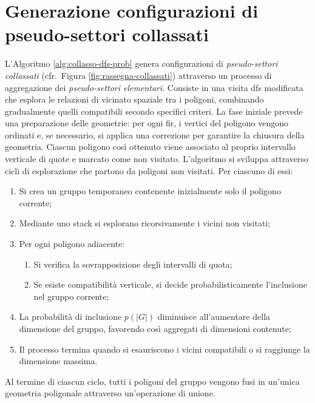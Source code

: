 \section{Generazione configurazioni di pseudo-settori collassati}
\label{subsec:algo-collassati}
L'Algoritmo \ref{alg:collasso-dfs-prob} genera configurazioni di \emph{pseudo-settori collassati} (cfr.\ Figura \ref{fig:rassegna-collassati}) attraverso un processo di aggregazione dei \emph{pseudo-settori elementari}. Consiste in una visita \gls{dfs} modificata che esplora le relazioni di vicinato spaziale tra i poligoni, combinando gradualmente quelli compatibili secondo specifici criteri.
La fase iniziale prevede una preparazione delle geometrie: per ogni \gls{fir}, i vertici del poligono vengono ordinati e, se necessario, si applica una correzione per garantire la chiusura della geometria. Ciascun poligono così ottenuto viene associato al proprio intervallo verticale di quote e marcato come non visitato.
L'algoritmo si sviluppa attraverso cicli di esplorazione che partono da poligoni non visitati. Per ciascuno di essi:
\DisablePunct
\begin{enumerate}
	\item Si crea un gruppo temporaneo contenente inizialmente solo il poligono corrente;
	\item Mediante uno stack si esplorano ricorsivamente i vicini non visitati;
	\item Per ogni poligono adiacente:
	\begin{enumerate}
		\item Si verifica la sovrapposizione degli intervalli di quota;
		\item Se esiste compatibilità verticale, si decide probabilisticamente l'inclusione nel gruppo corrente;
	\end{enumerate}
	\item La probabilità di inclusione \(p(|G|)\) diminuisce all'aumentare della dimensione del gruppo, favorendo così aggregati di dimensioni contenute;
	\item Il processo termina quando si esauriscono i vicini compatibili o si raggiunge la dimensione massima. 
\end{enumerate}
\EnablePunct
Al termine di ciascun ciclo, tutti i poligoni del gruppo vengono fusi in un'unica geometria poligonale attraverso un'operazione di unione.

